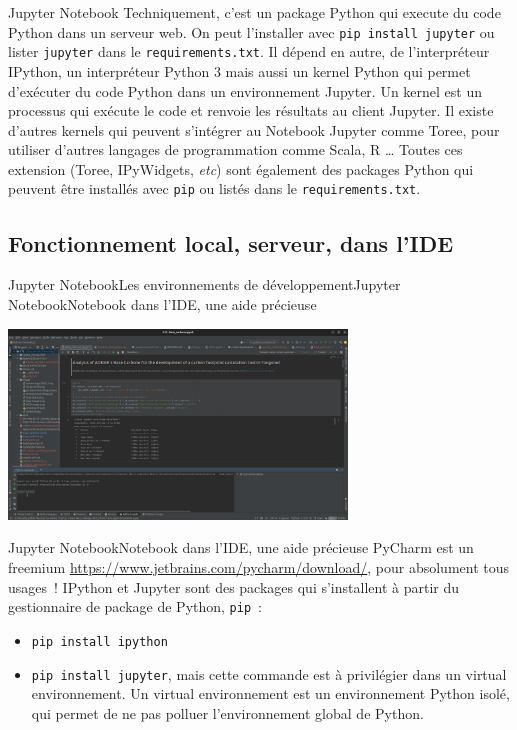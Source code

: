 \documentclass{beamer}
\begin{document}
    \begin{frame}[fragile]{Jupyter Notebook}
        Techniquement, c'est un package Python qui execute du code Python dans un serveur web.
        On peut l'installer avec \lstinline{pip install jupyter} ou lister \lstinline{jupyter} dans le \lstinline{requirements.txt}.
        \bigbreak
        Il dépend en autre, de l'interpréteur IPython, un interpréteur Python 3 mais aussi un kernel Python qui permet d'exécuter du code Python dans un environnement Jupyter.
        Un kernel est un processus qui exécute le code et renvoie les résultats au client Jupyter.
        Il existe d'autres kernels qui peuvent s'intégrer au Notebook Jupyter comme Toree, pour utiliser d'autres langages de programmation comme Scala, R \ldots{}
        \bigbreak
        Toutes ces extension (Toree, IPyWidgets, \textit{etc}) sont également des packages Python qui peuvent être installés avec \lstinline{pip} ou listés dans le \lstinline{requirements.txt}.
    \end{frame}

    \subsection{Fonctionnement local, serveur, dans l'IDE}
    \begin{frame}{Jupyter Notebook}{Les environnements de développement}{Jupyter Notebook}{Notebook dans l'IDE, une aide précieuse}
        \begin{center}
            \includegraphics[width=9cm]{image/pycharm-notebook-repl}
        \end{center}
    \end{frame}

    \begin{frame}{Jupyter Notebook}{Notebook dans l'IDE, une aide précieuse}
        PyCharm est un freemium \url{https://www.jetbrains.com/pycharm/download/}, pour absolument tous usages~!
        \bigbreak
        IPython et Jupyter sont des packages qui s'installent à partir du gestionnaire de package de Python, \lstinline{pip}~:
        \begin{itemize}
            \item \lstinline{pip install ipython}
            \item \lstinline{pip install jupyter}, mais cette commande est à privilégier dans un virtual environnement.
            Un virtual environnement est un environnement Python isolé, qui permet de ne pas polluer l'environnement global de Python.
        \end{itemize}
    \end{frame}
\end{document}
